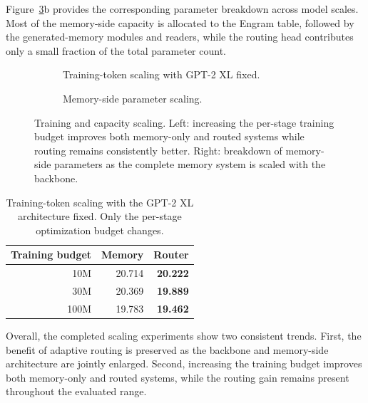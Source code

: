 Figure~\ref{fig:token-param-scaling}b provides the corresponding parameter
breakdown across model scales. Most of the memory-side capacity is allocated
to the Engram table, followed by the generated-memory modules and readers,
while the routing head contributes only a small fraction of the total
parameter count.

\begin{figure}[t]
    \centering

    \begin{subfigure}[t]{0.45\linewidth}
        \centering
        \caption{Training-token scaling with GPT-2 XL fixed.}
        \label{fig:scaling-tokens}
    \end{subfigure}
    \hfill
    \begin{subfigure}[t]{0.50\linewidth}
        \centering
        \caption{Memory-side parameter scaling.}
        \label{fig:scaling-params}
    \end{subfigure}

    \caption{
    Training and capacity scaling. Left: increasing the per-stage training
    budget improves both memory-only and routed systems while routing remains
    consistently better. Right: breakdown of memory-side parameters as the
    complete memory system is scaled with the backbone.
    }
    \label{fig:token-param-scaling}
\end{figure}

\begin{table}[h]
\centering
\caption{
Training-token scaling with the GPT-2 XL architecture fixed.
Only the per-stage optimization budget changes.
}
\label{tab:token-scaling}
\small
\setlength{\tabcolsep}{10pt}
\begin{tabular}{@{}rrr@{}}
\toprule
\textbf{Training budget}
& \textbf{Memory}
& \textbf{Router} \\
\midrule
10M
& 20.714
& \textbf{20.222} \\

30M
& 20.369
& \textbf{19.889} \\

100M
& 19.783
& \textbf{19.462} \\
\bottomrule
\end{tabular}
\end{table}

Overall, the completed scaling experiments show two consistent trends.
First, the benefit of adaptive routing is preserved as the backbone and
memory-side architecture are jointly enlarged. Second, increasing the training
budget improves both memory-only and routed systems, while the routing gain
remains present throughout the evaluated range.

